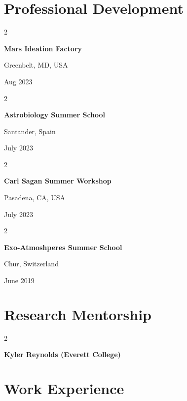 \documentclass[10pt, letterpaper]{article}
\newenvironment{twocolentry}[2][]{
    \onecolentry
    \def\secondColumn{#2}
    \setcolumnwidth{\fill, 4.5 cm}
    \begin{paracol}{2}
}{
    \switchcolumn \raggedleft \secondColumn
    \end{paracol}
    \endonecolentry
} %
\begin{document}
    
    \section{Professional Development}



        
        \begin{twocolentry}{
            Greenbelt, MD, USA

        Aug 2023
        }
            \textbf{Mars Ideation Factory}
        \end{twocolentry}


        \vspace{0.2 cm}

        \begin{twocolentry}{
            Santander, Spain

        July 2023
        }
            \textbf{Astrobiology Summer School}
        \end{twocolentry}


        \vspace{0.2 cm}

        \begin{twocolentry}{
            Pasadena, CA, USA

        July 2023
        }
            \textbf{Carl Sagan Summer Workshop}
        \end{twocolentry}


        \vspace{0.2 cm}

        \begin{twocolentry}{
            Chur, Switzerland

        June 2019
        }
            \textbf{Exo-Atmoshperes Summer School}
        \end{twocolentry}



    
    \section{Research Mentorship}



        
        \begin{twocolentry}{
            2024
        }
            \textbf{Kyler Reynolds (Everett College)}
        \end{twocolentry}



    
    \section{Work Experience}
\end{document}

